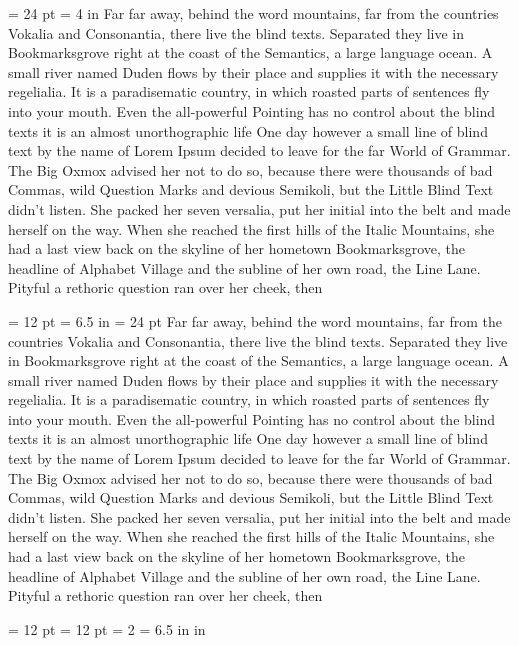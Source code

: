 \parindent = 24 pt
\hsize = 4 in
 Far far away, behind the word mountains, far from the countries Vokalia and Consonantia, 
there live the blind texts. Separated they live in Bookmarksgrove right at the coast of 
the Semantics, a large language ocean. A small river named Duden flows by their place and 
supplies it with the necessary regelialia. It is a paradisematic country, in which roasted 
parts of sentences fly into your mouth. Even the all-powerful Pointing has no control about 
the blind texts it is an almost unorthographic life One day however a small line of blind text 
by the name of Lorem Ipsum decided to leave for the far World of Grammar. The Big Oxmox advised 
her not to do so, because there were thousands of bad Commas, wild Question Marks and devious Semikoli,
 but the Little Blind Text didn’t listen. She packed her seven versalia, put her initial into the belt 
 and made herself on the way. When she reached the first hills of the Italic Mountains, she had a 
 last view back on the skyline of her hometown Bookmarksgrove, the headline of Alphabet Village and 
 the subline of her own road, the Line Lane. Pityful a rethoric question ran over her cheek, then 
 
\parindent = 12 pt
\hsize = 6.5 in
\baselineskip = 24 pt
 Far far away, behind the word mountains, far from the countries Vokalia and Consonantia, 
there live the blind texts. Separated they live in Bookmarksgrove right at the coast of 
the Semantics, a large language ocean. A small river named Duden flows by their place and 
supplies it with the necessary regelialia. It is a paradisematic country, in which roasted 
parts of sentences fly into your mouth. Even the all-powerful Pointing has no control about 
the blind texts it is an almost unorthographic life One day however a small line of blind text 
by the name of Lorem Ipsum decided to leave for the far World of Grammar. The Big Oxmox advised 
her not to do so, because there were thousands of bad Commas, wild Question Marks and devious Semikoli,
 but the Little Blind Text didn’t listen. She packed her seven versalia, put her initial into the belt 
 and made herself on the way. When she reached the first hills of the Italic Mountains, she had a 
 last view back on the skyline of her hometown Bookmarksgrove, the headline of Alphabet Village and 
 the subline of her own road, the Line Lane. Pityful a rethoric question ran over her cheek, then 
 
 \eject
 \baselineskip = 12 pt
 \parindent = 12 pt
 \parskip = 2\baselineskip
 \hsize = 6.5 in 
  in

